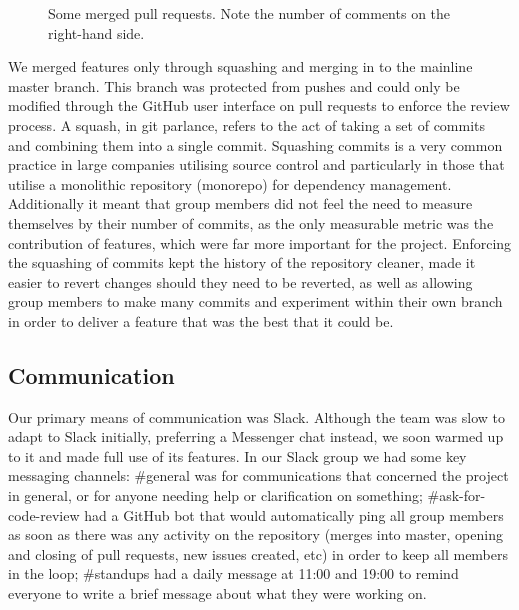 \begin{figure}[htbp]
\centering
{}
\caption{Some merged pull requests. Note the number of comments on the right-hand side.}
\label{pr}
\end{figure}

We merged features only through squashing and merging in to the mainline master branch. This branch was protected from pushes and could only be modified through the GitHub user interface on pull requests to enforce the review process. A squash, in git parlance, refers to the act of taking a set of commits and combining them into a single commit. Squashing commits is a very common practice in large companies utilising source control and particularly in those that utilise a monolithic repository (monorepo) for dependency management. Additionally it meant that group members did not feel the need to measure themselves by their number of commits, as the only measurable metric was the contribution of features, which were far more important for the project. Enforcing the squashing of commits kept the history of the repository cleaner, made it easier to revert changes should they need to be reverted, as well as allowing group members to make many commits and experiment within their own branch in order to deliver a feature that was the best that it could be.

\subsection{Communication}

Our primary means of communication was Slack. Although the team was slow to adapt to Slack initially, preferring a Messenger chat instead, we soon warmed up to it and made full use of its features. In our Slack group we had some key messaging channels: \#general was for communications that concerned the project in general, or for anyone needing help or clarification on something; \#ask-for-code-review had a GitHub bot that would automatically ping all group members as soon as there was any activity on the repository (merges into master, opening and closing of pull requests, new issues created, etc) in order to keep all members in the loop; \#standups had a daily message at 11:00 and 19:00 to remind everyone to write a brief message about what they were working on.

